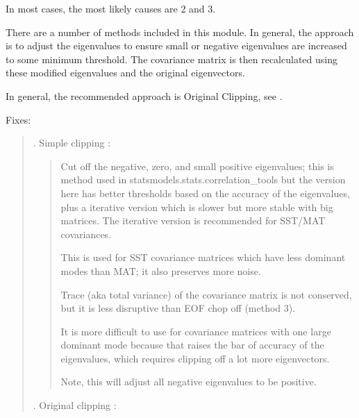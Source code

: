 \documentclass[letterpaper,10pt,english]{sphinxmanual}
\begin{document}
\sphinxAtStartPar
In most cases, the most likely causes are 2 and 3.

\sphinxAtStartPar
There are a number of methods included in this module. In general, the approach
is to adjust the eigenvalues to ensure small or negative eigenvalues are
increased to some minimum threshold. The covariance matrix is then re\sphinxhyphen{}calculated
using these modified eigenvalues and the original eigenvectors.

\sphinxAtStartPar
In general, the recommended approach is Original Clipping, see
{\hyperref[\detokenize{misc:glomar_gridding.covariance_tools.eigenvalue_clip}]{}}.

\sphinxAtStartPar
Fixes:
\begin{quote}

. Simple clipping \sphinxhyphen{}
{\hyperref[\detokenize{misc:glomar_gridding.covariance_tools.simple_clipping}]{}}:
\begin{quote}

\sphinxAtStartPar
Cut off the negative, zero, and small positive eigenvalues; this is
method used in statsmodels.stats.correlation\_tools but the version here
has better thresholds based on the accuracy of the eigenvalues, plus a
iterative version which is slower but more stable with big matrices. The
iterative version is recommended for SST/MAT covariances.

\sphinxAtStartPar
This is used for SST covariance matrices which have less dominant modes
than MAT; it also preserves more noise.

\sphinxAtStartPar
Trace (aka total variance) of the covariance matrix is not conserved,
but it is less disruptive than EOF chop off (method 3).

\sphinxAtStartPar
It is more difficult to use for covariance matrices with one large
dominant mode because that raises the bar of accuracy of the
eigenvalues, which requires clipping off a lot more eigenvectors.

\sphinxAtStartPar
Note, this will adjust all negative eigenvalues to be positive.
\end{quote}

. Original clipping \sphinxhyphen{}
{\hyperref[\detokenize{misc:glomar_gridding.covariance_tools.eigenvalue_clip}]{}}:
\begin{quote}


\end{quote}
\end{quote}
\end{document}
